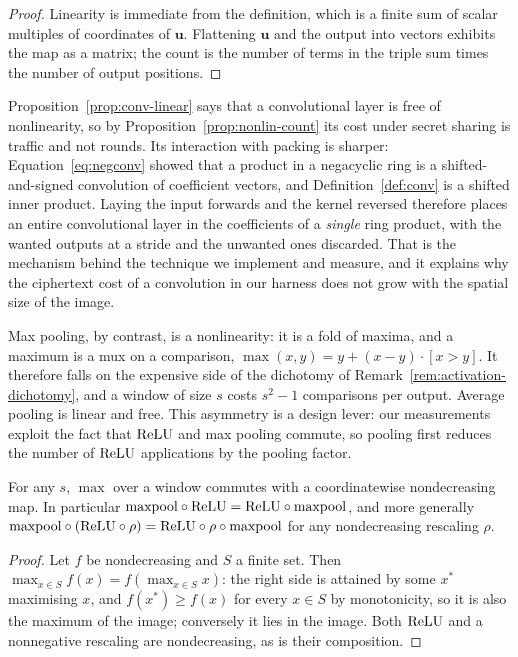 \begin{proof}
Linearity is immediate from the definition, which is a finite sum of scalar
multiples of coordinates of $\mathbf{u}$. Flattening $\mathbf{u}$ and the output
into vectors exhibits the map as a matrix; the count is the number of terms in the
triple sum times the number of output positions.
\end{proof}

Proposition~\ref{prop:conv-linear} says that a convolutional layer is free of
nonlinearity, so by Proposition~\ref{prop:nonlin-count} its cost under secret
sharing is traffic and not rounds. Its interaction with packing is sharper:
Equation~\eqref{eq:negconv} showed that a product in a negacyclic ring is a
shifted-and-signed convolution of coefficient vectors, and
Definition~\ref{def:conv} is a shifted inner product. Laying the input forwards
and the kernel reversed therefore places an entire convolutional layer in the
coefficients of a \emph{single} ring product, with the wanted outputs at a stride
and the unwanted ones discarded. That is the mechanism behind the technique we
implement and measure, and it explains why the ciphertext cost of a convolution in
our harness does not grow with the spatial size of the image.

Max pooling, by contrast, is a nonlinearity: it is a fold of maxima, and a maximum
is a mux on a comparison, $\max(x,y) = y + (x-y)\cdot[x>y]$. It therefore falls on
the expensive side of the dichotomy of Remark~\ref{rem:activation-dichotomy}, and
a window of size $s$ costs $s^2-1$ comparisons per output. Average pooling is
linear and free. This asymmetry is a design lever: our measurements exploit the
fact that $\mathrm{ReLU}$ and max pooling commute, so pooling first reduces the number of
$\mathrm{ReLU}$ applications by the pooling factor.

\begin{proposition}
\label{prop:pool-commute}
For any $s$, $\max$ over a window commutes with a coordinatewise nondecreasing
map. In particular $\mathrm{maxpool} \circ \mathrm{ReLU} = \mathrm{ReLU} \circ \mathrm{maxpool}$,
and more generally $\mathrm{maxpool} \circ (\mathrm{ReLU} \circ \rho) = \mathrm{ReLU} \circ \rho
\circ \mathrm{maxpool}$ for any nondecreasing rescaling $\rho$.
\end{proposition}

\begin{proof}
Let $f$ be nondecreasing and $S$ a finite set. Then $\max_{x \in S} f(x) =
f(\max_{x\in S} x)$: the right side is attained by some $x^\ast$ maximising $x$,
and $f(x^\ast) \ge f(x)$ for every $x \in S$ by monotonicity, so it is also the
maximum of the image; conversely it lies in the image. Both $\mathrm{ReLU}$ and a
nonnegative rescaling are nondecreasing, as is their composition.
\end{proof}

